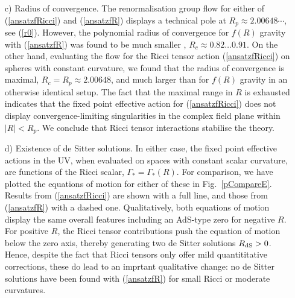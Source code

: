 \documentclass[notitlepage,eqsecnum,bm,amsmath,preprintnumbers,superscriptaddress,nofootinbib,aps,11pt]{revtex4-1}
\def\eq#1{(\ref{#1})}
\begin{document}
\begin{itemize}
\item[c)] 
Radius of convergence. The renormalisation group flow for either of \eq{ansatzfRicci} and \eq{ansatzfR} displays a technical pole at  $R_p\approx 2.00648\cdots$, see \eq{r0}. However, the polynomial radius of convergence for $f(R)$ gravity with \eq{ansatzfR} was found to be much smaller \cite{Falls:2016wsa}, 
$R_c\approx 0.82 \ldots 0.91$.
On the other hand, evaluating the flow for the Ricci tensor action \eq{ansatzfRicci} on spheres with constant curvature, we found that the radius of convergence is maximal,
$R_c=R_p\approx 2.00648$,
and much larger than for $f(R)$ gravity in an otherwise identical setup. The fact that the maximal range in $R$ is exhausted indicates that the fixed point effective action for \eq{ansatzfRicci} does not display convergence-limiting singularities in the complex field plane within $|R|<R_p$. We conclude that Ricci tensor interactions stabilise the theory.


 




\item[d)] 
Existence of de Sitter solutions. In either case, the fixed point effective actions in the UV, when evaluated on spaces with constant scalar curvature, are functions of the Ricci scalar, $\Gamma_*=\Gamma_*(R)$. For comparison, we have plotted the equations of motion for either of these  in Fig.~\ref{pCompareE}. Results from \eq{ansatzfRicci} are shown with a full line, and those from \eq{ansatzfR} with a dashed one.  
Qualitatively, both equations of motion display the same overall features including an AdS-type zero for negative $R$. For positive $R$, the Ricci tensor contributions push the equation of motion below the zero axis, thereby generating two de Sitter solutions $R_{\rm dS}>0$. Hence, despite the fact that Ricci tensors only offer mild quantititative corrections, these do lead to an imprtant qualitative change: no de Sitter solutions have been found with \eq{ansatzfR} for small Ricci or moderate curvatures.


\end{itemize}
\end{document}
